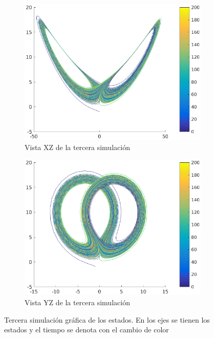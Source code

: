 \documentclass[12pt,letterpaper]{article}
\begin{document}
\begin{figure}
\begin{subfigure}[t]{0.36\textwidth}
		\label{fig:simulacion3xy}
	\end{subfigure}
        \vfill
        \begin{subfigure}[b]{0.36\textwidth}
		\includegraphics[width=\textwidth]{pictures/tercera_simulacion_xz}
		\caption{Vista XZ de la tercera simulación}
		\label{fig:simulacion3xz}
	\end{subfigure}
        \begin{subfigure}[b]{0.36\textwidth}
		\includegraphics[width=\textwidth]{pictures/tercera_simulacion_yz}
		\caption{Vista YZ de la tercera simulación}
		\label{fig:simulacion3yz}
	\end{subfigure}
	\caption[justification=centering]{Tercera simulación gráfica de los estados. En los ejes se tienen los estados y el tiempo se denota con el cambio de color}
	\label{fig:simulacion3_total}
\end{figure}
\end{document}
